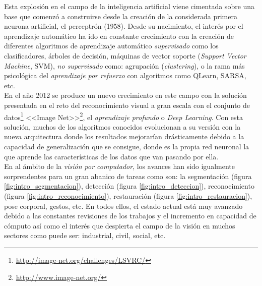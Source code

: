 Esta explosión en el campo de la inteligencia artificial viene cimentada sobre una base que comenzó a construirse desde la creación de la considerada primera neurona artificial, el perceptrón (1958). Desde su nacimiento, el interés por el aprendizaje automático ha ido en constante crecimiento con la creación de diferentes algoritmos de aprendizaje automático \textit{supervisado} como los clasificadores, árboles de decisión, máquinas de vector soporte (\textit{Support Vector Machine}, SVM), \textit{no supervisado} como: agrupación (\textit{clustering}), o la rama más psicológica del \textit{aprendizaje por refuerzo} con algoritmos como QLearn, SARSA, etc.\\

En el año 2012 se produce un nuevo crecimiento en este campo con la solución presentada en el reto del reconocimiento visual a gran escala con el conjunto de datos\footnote{\url{http://image-net.org/challenges/LSVRC/}} <<Image Net>>\footnote{\url{http://www.image-net.org/}}, el \textit{aprendizaje profundo} o \textit{Deep Learning}. Con esta solución, muchos de los algoritmos conocidos evolucionan a su versión con la nueva arquitectura donde los resultados mejorarían drásticamente debido a la capacidad de generalización que se consigue, donde es la propia red neuronal la que aprende las características de los datos que van pasando por ella.\\

En al ámbito de la \textit{visión por computador}, los avances han sido igualmente sorprendentes para un gran abanico de tareas como son: la segmentación (figura \ref{fig:intro_segmentacion}), detección (figura \ref{fig:intro_deteccion}), reconocimiento (figura \ref{fig:intro_reconocimiento}), restauración (figura \ref{fig:intro_restauracion}), pose corporal, gestos, etc. En todos ellos, el estado actual está muy avanzado debido a las constantes revisiones de los trabajos y el incremento en capacidad de cómputo así como el interés que despierta el campo de la visión en muchos sectores como puede ser: industrial, civil, social, etc.\\

